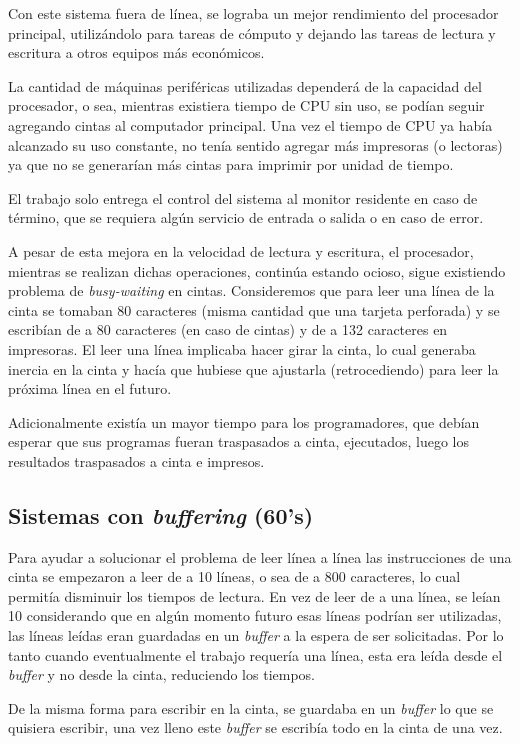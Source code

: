 Con este sistema fuera de línea, se lograba un mejor rendimiento del procesador
principal, utilizándolo para tareas de cómputo y dejando las tareas de lectura y
escritura a otros equipos más económicos.

La cantidad de máquinas periféricas utilizadas dependerá de la capacidad del
procesador, o sea, mientras existiera tiempo de CPU sin uso, se podían seguir
agregando cintas al computador principal. Una vez el tiempo de CPU ya había
alcanzado su uso constante, no tenía sentido agregar más impresoras (o lectoras)
ya que no se generarían más cintas para imprimir por unidad de tiempo.

El trabajo solo entrega el control del sistema al monitor residente en caso de
término, que se requiera algún servicio de entrada o salida o en caso de error.

A pesar de esta mejora en la velocidad de lectura y escritura, el procesador,
mientras se realizan dichas operaciones, continúa estando ocioso, sigue
existiendo problema de \textit{busy-waiting} en cintas. Consideremos que para
leer una línea de la cinta se tomaban 80 caracteres (misma cantidad que una
tarjeta perforada) y se escribían de a 80 caracteres (en caso de cintas) y de a
132 caracteres en impresoras. El leer una línea implicaba hacer girar la cinta,
lo cual generaba inercia en la cinta y hacía que hubiese que ajustarla
(retrocediendo) para leer la próxima línea en el futuro.

Adicionalmente existía un mayor tiempo para los programadores, que debían
esperar que sus programas fueran traspasados a cinta, ejecutados, luego los
resultados traspasados a cinta e impresos.

\subsection{Sistemas con \textit{buffering} (60's)}
Para ayudar a solucionar el problema de leer línea a línea las instrucciones de
una cinta se empezaron a leer de a 10 líneas, o sea de a 800 caracteres, lo cual
permitía disminuir los tiempos de lectura. En vez de leer de a una línea, se
leían 10 considerando que en algún momento futuro esas líneas podrían ser
utilizadas, las líneas leídas eran guardadas en un \textit{buffer} a la espera
de ser solicitadas. Por lo tanto cuando eventualmente el trabajo requería una
línea, esta era leída desde el \textit{buffer} y no desde la cinta, reduciendo
los tiempos.

De la misma forma para escribir en la cinta, se guardaba en un \textit{buffer}
lo que se quisiera escribir, una vez lleno este \textit{buffer} se escribía todo
en la cinta de una vez.

